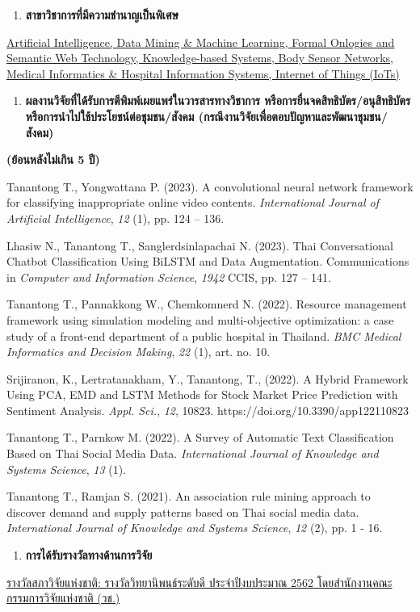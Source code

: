 \documentclass[16pt]{extarticle}
\begin{document}
\begin{enumerate}
\def\labelenumi{\arabic{enumi}.}
\setcounter{enumi}{5}
\item
  \textbf{สาขาวิชาการที่มีความชำนาญเป็นพิเศษ}
\end{enumerate}

\noindent\hspace{1em}\uline{Artificial Intelligence, Data Mining \& Machine Learning, Formal
Onlogies and Semantic Web Technology, Knowledge-based Systems, Body
Sensor Networks, Medical Informatics \& Hospital Information Systems,
Internet of Things (IoTs)}

\begin{enumerate}
\def\labelenumi{\arabic{enumi}.}
\setcounter{enumi}{6}
\item
  \textbf{ผลงานวิจัยที่ได้รับการตีพิมพ์เผยแพร่ในวารสารทางวิชาการ
  หรือการยื่นจดสิทธิบัตร/อนุสิทธิบัตร หรือการนำไปใช้ประโยชน์ต่อชุมชน/สังคม
  (กรณีงานวิจัยเพื่อตอบปัญหาและพัฒนาชุมชน/สังคม)}
\end{enumerate}

\textbf{(ย้อนหลังไม่เกิน 5 ปี)}

Tanantong T., Yongwattana P. (2023). A convolutional neural network
framework for classifying inappropriate online video contents.
\emph{International Journal of Artificial Intelligence}, \emph{12} (1),
pp. 124 -- 136.

Lhasiw N., Tanantong T., Sanglerdsinlapachai N. (2023). Thai
Conversational Chatbot Classification Using BiLSTM and Data
Augmentation. Communications in \emph{Computer and Information Science},
\emph{1942} CCIS, pp. 127 -- 141.

Tanantong T., Pannakkong W., Chemkomnerd N. (2022). Resource management
framework using simulation modeling and multi-objective optimization: a
case study of a front-end department of a public hospital in Thailand.
\emph{BMC Medical Informatics and Decision Making}, \emph{22} (1), art.
no. 10.

Srijiranon, K., Lertratanakham, Y., Tanantong, T., (2022). A Hybrid
Framework Using PCA, EMD and LSTM Methods for Stock Market Price
Prediction with Sentiment Analysis. \emph{Appl. Sci.}, \emph{12}, 10823.
https://doi.org/10.3390/app122110823

Tanantong T., Parnkow M. (2022). A Survey of Automatic Text
Classification Based on Thai Social Media Data. \emph{International
Journal of Knowledge and Systems Science}, \emph{13} (1).

Tanantong T., Ramjan S. (2021). An association rule mining approach to
discover demand and supply patterns based on Thai social media data.
\emph{International Journal of Knowledge and Systems Science}, \emph{12}
(2), pp. 1 - 16.

\begin{enumerate}
\def\labelenumi{\arabic{enumi}.}
\setcounter{enumi}{7}
\item
  \textbf{การได้รับรางวัลทางด้านการวิจัย}
\end{enumerate}

\uline{รางวัลสภาวิจัยแห่งชาติ: รางวัลวิทยานิพนธ์ระดับดี ประจำปีงบประมาณ 2562
โดยสำนักงานคณะกรรมการวิจัยแห่งชาติ (วช.)}
\end{document}
